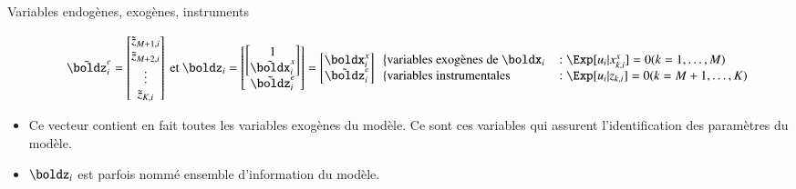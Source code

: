 \begin{frame}[allowframebreaks]{Variables endogènes, exogènes, instruments}
\begin{itemize}
    \[
       \tilde{\boldz}_i^e = 
       \begin{bmatrix} 
        \tilde{z}_{M+1, i}\\
        \tilde{z}_{M+2, i}\\
        \vdots\\
        \tilde{z}_{K, i}
       \end{bmatrix}
       \ \text{et} \
       \boldz_i = 
       \begin{bmatrix}
        \begin{bmatrix}
            1\\
            \tilde{\boldx}_i^x
        \end{bmatrix}\\ 
        \tilde{\boldz}_i^e
       \end{bmatrix}
       = 
       \begin{bmatrix}
        \boldx_i^x\\
        \tilde{\boldz}_i^e
       \end{bmatrix}
       \begin{array}{ll}
        \left\{ \text{variables exogènes de $\boldx_i$}\right.
         &: \Exp[u_i|x_{k, i}^x] = 0 (k=1,\ldots, M)\\
        \left\{ \text{variables instrumentales}\right.&:\Exp[u_i|z_{k, i}] = 0(k=M +1,\ldots,K)
       \end{array}
    \]
    \item Ce vecteur contient en fait toutes les variables exogènes du modèle. Ce sont 
    ces variables qui assurent l’identification des paramètres du modèle.
    \item $\boldz_i$  est parfois nommé ensemble d’information du modèle.
    \end{itemize}
\end{frame}

